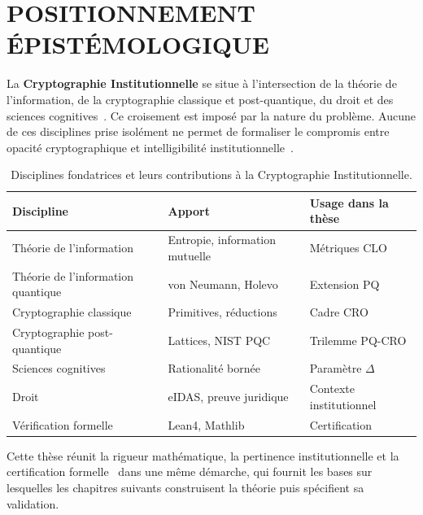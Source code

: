 \section{POSITIONNEMENT \'EPIST\'EMOLOGIQUE}
\label{sec:ig_positionnement}
\begin{sloppypar}

La \textbf{Cryptographie Institutionnelle} se situe \`a l'intersection de la th\'eorie
de l'information, de la cryptographie classique et post-quantique, du droit et des sciences cognitives~\cite{Simon82,Cowan2001,Ericsson95}.
Ce croisement est impos\'e par la nature du probl\`eme. Aucune de ces disciplines prise isol\'ement ne permet
de formaliser le compromis entre opacit\'e cryptographique et intelligibilit\'e
institutionnelle~\cite{Citron14,Casey10,Casey11}.

\begin{table}[htbp]
\centering
\caption{Disciplines fondatrices et leurs contributions \`a la Cryptographie Institutionnelle.}
\label{tab:disciplines_fondatrices}
{\footnotesize
\begin{tabular}{p{3.8cm}p{5.2cm}p{3.2cm}}
\toprule
\textbf{Discipline} & \textbf{Apport} & \textbf{Usage dans la th\`ese} \\
\midrule
Th\'eorie de l'information & Entropie, information mutuelle~\cite{CoverThomas06,Wyner75,WynerZiv76} & M\'etriques CLO \\
Th\'eorie de l'information quantique & von Neumann, Holevo~\cite{NielsenChuang2010,Wilde2017,Hiai1991} & Extension PQ \\
Cryptographie classique & Primitives, r\'eductions~\cite{Goldreich01,GoldwasserMicali84} & Cadre CRO \\
Cryptographie post-quantique & Lattices, NIST PQC~\cite{NISTPQC,Kyber2022,Dilithium2022,Falcon2022} & Trilemme PQ-CRO \\
Sciences cognitives & Rationalit\'e born\'ee~\cite{Simon82,Miller56,Kahneman11} & Param\`etre $\Delta$ \\
Droit & eIDAS, preuve juridique~\cite{eIDAS14,GDPR2016,ESIGN00,Daubert1993} & Contexte institutionnel \\
V\'erification formelle & Lean4, Mathlib~\cite{moura2015lean,Lean4,Mathlib,Wiedijk2007} & Certification \\
\bottomrule
\end{tabular}
}
\end{table}

Cette th\`ese r\'eunit la rigueur math\'ematique, la pertinence
institutionnelle et la certification formelle~\cite{Gonthier08,Leroy09,BhargavanEA2017}
dans une m\^eme d\'emarche, qui fournit les bases sur lesquelles
les chapitres suivants construisent la th\'eorie puis sp\'ecifient sa validation.

\end{sloppypar}


